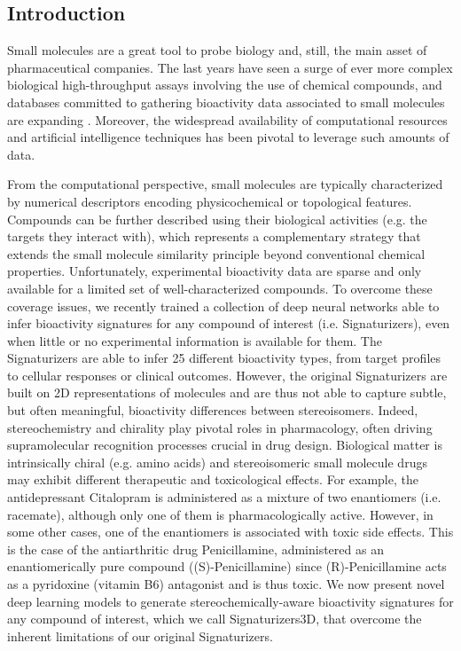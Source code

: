 \subsection{Introduction}


Small molecules are a great tool to probe biology and, still, the main asset of pharmaceutical companies. The last years have seen a surge of ever more complex biological high-throughput assays involving the use of chemical compounds, and databases committed to gathering bioactivity data associated to small molecules are expanding \cite{zdrazil_chembl_2024, kim_pubchem_2023}. Moreover, the widespread availability of computational resources\cite{tetko_bigchem_2016} and artificial intelligence techniques has been pivotal to leverage such amounts of data\cite{von_lilienfeld_retrospective_2020}. 

From the computational perspective, small molecules are typically characterized by numerical descriptors encoding physicochemical or topological features\cite{fernandez-torras_connecting_2022}. Compounds can be further described using their biological activities (e.g. the targets they interact with), which represents a complementary strategy that extends the small molecule similarity principle beyond conventional chemical properties\cite{duran-frigola_extending_2020}. Unfortunately, experimental bioactivity data are sparse and only available for a limited set of well-characterized compounds. To overcome these coverage issues, we recently trained a collection of deep neural networks able to infer bioactivity signatures for any compound of interest (i.e. Signaturizers), even when little or no experimental information is available for them\cite{bertoni_bioactivity_2021}. The Signaturizers are able to infer 25 different bioactivity types, from target profiles to cellular responses or clinical outcomes. However, the original Signaturizers are built on 2D representations of molecules and are thus not able to capture subtle, but often meaningful, bioactivity differences between stereoisomers. Indeed, stereochemistry and chirality play pivotal roles in pharmacology\cite{scott_stereochemical_2022, h_brooks_significance_2011}, often driving supramolecular recognition processes crucial in drug design. Biological matter is intrinsically chiral\cite{inaki_cell_2016} (e.g. amino acids) and stereoisomeric small molecule drugs may exhibit different therapeutic and toxicological effects\cite{mcconathy_stereochemistry_2003, smith_chiral_2009}. For example, the antidepressant Citalopram is administered as a mixture of two enantiomers (i.e. racemate), although only one of them is pharmacologically active\cite{snchez_escitalopram_2004, sanchez_pharmacology_2006}. However, in some other cases, one of the enantiomers is associated with toxic side effects. This is the case of the antiarthritic drug Penicillamine, administered as an enantiomerically pure compound ((S)-Penicillamine) since (R)-Penicillamine acts as a pyridoxine (vitamin B6) antagonist and is thus toxic\cite{smith_chiral_2009, williams_enantiomers_1990}. We now present novel deep learning models to generate stereochemically-aware bioactivity signatures for any compound of interest, which we call Signaturizers3D, that overcome the inherent limitations of our original Signaturizers. 

